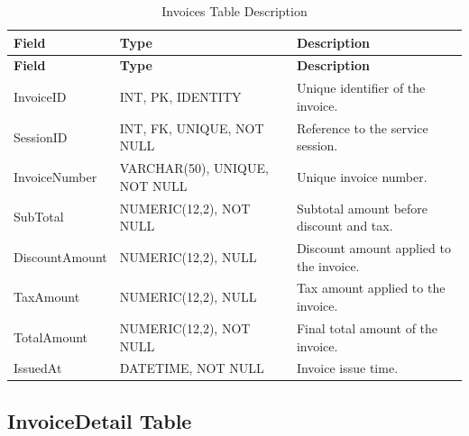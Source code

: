\begin{longtable}{
		|>{\raggedright\arraybackslash}p{3.2cm}|
		>{\raggedright\arraybackslash}p{4.2cm}|
		>{\raggedright\arraybackslash}p{5.0cm}|
	}
	\caption{Invoices Table Description}
	\label{tab:invoices}\\
	\hline
	\textbf{Field} & \textbf{Type} & \textbf{Description} \\ \hline
	\endfirsthead
	\hline
	\textbf{Field} & \textbf{Type} & \textbf{Description} \\ \hline
	\endhead
	
	InvoiceID & INT, PK, IDENTITY &
	Unique identifier of the invoice. \\ \hline
	
	SessionID & INT, FK, UNIQUE, NOT NULL &
	Reference to the service session. \\ \hline
	
	InvoiceNumber & VARCHAR(50), UNIQUE, NOT NULL &
	Unique invoice number. \\ \hline
	
	SubTotal & NUMERIC(12,2), NOT NULL &
	Subtotal amount before discount and tax. \\ \hline
	
	DiscountAmount & NUMERIC(12,2), NULL &
	Discount amount applied to the invoice. \\ \hline
	
	TaxAmount & NUMERIC(12,2), NULL &
	Tax amount applied to the invoice. \\ \hline
	
	TotalAmount & NUMERIC(12,2), NOT NULL &
	Final total amount of the invoice. \\ \hline
	
	IssuedAt & DATETIME, NOT NULL &
	Invoice issue time. \\ \hline
	
\end{longtable}


\subsection{InvoiceDetail Table}

